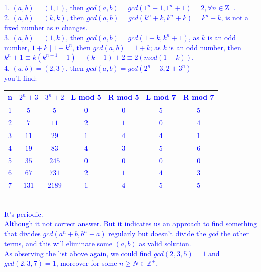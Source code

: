 \documentclass{Math_Note}
\begin{document}
\begin{sol}
\textcolor{blue}{
1. $\left(a,b\right)=\left(1,1\right)$, then $gcd\left(a,b\right)=gcd\left(1^{n}+1,1^{n}+1\right)=2, \forall n\in\mathrm{Z^{+}}$. \\ 
2. $\left(a,b\right)=\left(k,k\right)$, then $gcd\left(a,b\right)=gcd\left(k^{n}+k,k^{n}+k\right)=k^{n}+k$, is not a fixed number as $n$ changes. \\
3. $\left(a,b\right)=\left(1,k\right)$, then $gcd\left(a,b\right)=gcd\left(1+k,k^{n}+1\right)$, as $k$ is an odd number, $1+k\mid1+k^{n}$, 
then $gcd\left(a,b\right)=1+k$; as $k$ is an odd number, then $k^{n}+1\equiv k\left(k^{n-1}+1\right)-\left(k+1\right)+2\equiv 2 \left(mod(1+k)\right)$. \\
4. $\left(a,b\right)=\left(2,3\right)$, then $gcd\left(a,b\right)=gcd\left(2^{n}+3,2+3^{n}\right)$ \\
you'll find: \\
\begin{table}[h!]
    \begin{center}
    \textcolor{blue}{
    \begin{tabular}{|c|c|c|c|c|c|c|}
        \hline
        n & $2^{n}+3$ & $3^{n}+2$ & L mod 5 & R mod 5 & L mod 7 & R mod 7 \\
        \hline
        1 & $5$ & $5$ & $0$ & $0$ & $5$ & $5$ \\
        \hline
        2 & $7$ & $11$ & $2$ & $1$ & $0$ & $4$ \\
        \hline
        3 & $11$ & $29$ & $1$ & $4$ & $4$ & $1$ \\
        \hline
        4 & $19$ & $83$ & $4$ & $3$ & $5$ & $6$ \\
        \hline
        5 & $35$ & $245$ & $0$ & $0$ & $0$ & $0$ \\
        \hline
        6 & $67$ & $731$ & $2$ & $1$ & $4$ & $3$ \\
        \hline
        7 & $131$ & $2189$ & $1$ & $4$ & $5$ & $5$ \\
        \hline
    \end{tabular}}
    \end{center}
\end{table}
\\
It's periodic.\\
Although it not correct answer. But it indicates us an approach to find something that divides $gcd\left(a^{n}+b,b^{n}+a\right)$ regularly but 
doesn't divide the $gcd$ the other terms, and this will eliminate some $\left(a,b\right)$ as valid solution.\\
As observing the list above again, we could find $gcd\left(2,3,5\right)=1$ and $gcd\left(2,3,7\right)=1$, moreover for some $n\geq N\in\mathbb{Z}^{+}$, 
}
\end{sol}
\end{document}
